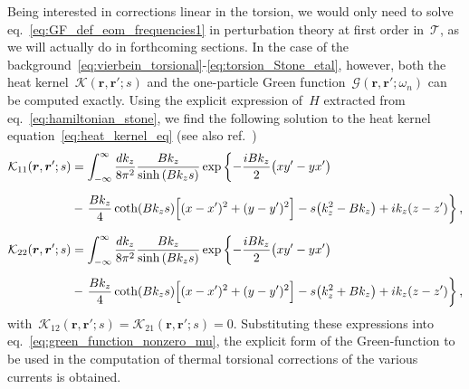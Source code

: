 \documentclass[11pt,a4paper]{article}
\begin{document}
Being interested in corrections linear in the torsion, we would only need to solve 
eq.~\eqref{eq:GF_def_eom_frequencies1}
in perturbation theory at first order in~$\mathcal{T}$, as we will actually do in forthcoming sections. 
In the case of the background~\eqref{eq:vierbein_torsional}-\eqref{eq:torsion_Stone_etal}, however,
both the heat kernel~$\boldsymbol{\mathcal{K}}(\boldsymbol{r},\boldsymbol{r}';s)$ and the
one-particle Green function~$\boldsymbol{\mathcal{G}}(\boldsymbol{r},\boldsymbol{r'};\omega_{n})$ 
can be computed exactly.
Using the explicit expression of~$H$ extracted from eq.~\eqref{eq:hamiltonian_stone}, 
we find the following solution to
the heat kernel equation~\eqref{eq:heat_kernel_eq}
(see also ref.~\cite{sondheimer_wilson}) 
\begin{align}
\mathcal{K}_{11}(\boldsymbol{r},\boldsymbol{r}';s)&=\int_{-\infty}^{\infty}{dk_{z}\over 8\pi^{2}}
{Bk_{z}\over \sinh{(Bk_{z}s)}}
\exp\left\{-{iBk_{z}\over 2}\big(xy'-yx'\big)\right. \nonumber \\[0.2cm]
&-\left.{Bk_{z}\over 4}\coth(Bk_{z}s)
\Big[(x-x')^{2}+(y-y')^{2}\Big]-s\big(k_{z}^{2}-Bk_{z}\big)+ik_{z}(z-z')\right\}, \nonumber \\[0.2cm]
\mathcal{K}_{22}(\boldsymbol{r},\boldsymbol{r}';s)&=\int_{-\infty}^{\infty}{dk_{z}\over 8\pi^{2}}
{Bk_{z}\over \sinh{(Bk_{z}s)}}
\exp\left\{-{iBk_{z}\over 2}\big(xy'-yx'\big)\right. 
\label{eq:heat_kernel_final} \\[0.2cm]
&-\left.{Bk_{z}\over 4}\coth(Bk_{z}s)
\Big[(x-x')^{2}+(y-y')^{2}\Big]-s\big(k_{z}^{2}+Bk_{z}\big)+ik_{z}(z-z')\right\},
\nonumber
\end{align}
with~$\mathcal{K}_{12}(\boldsymbol{r},\boldsymbol{r}';s)=\mathcal{K}_{21}(\boldsymbol{r},\boldsymbol{r}';s)=0$. Substituting
these expressions
into eq.~\eqref{eq:green_function_nonzero_mu}, the explicit form of the
Green-function to be used in the computation of thermal 
torsional corrections of the various currents is obtained.
\end{document}
